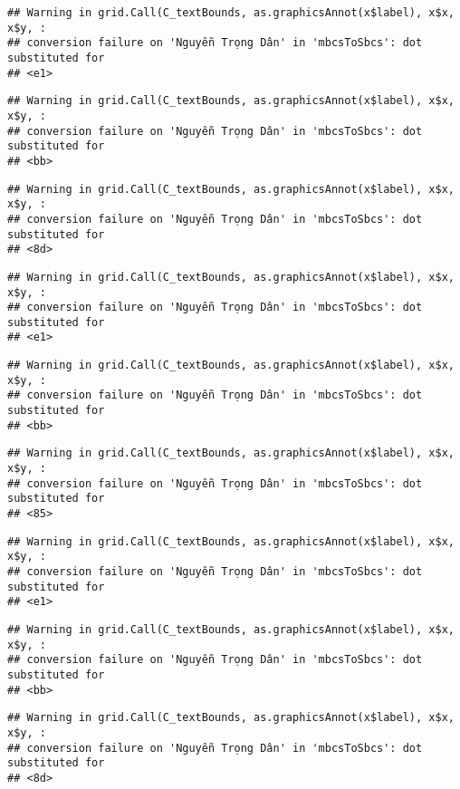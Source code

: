 \documentclass[
]{article}
\begin{document}
\begin{verbatim}
## Warning in grid.Call(C_textBounds, as.graphicsAnnot(x$label), x$x, x$y, :
## conversion failure on 'Nguyễn Trọng Dân' in 'mbcsToSbcs': dot substituted for
## <e1>
\end{verbatim}

\begin{verbatim}
## Warning in grid.Call(C_textBounds, as.graphicsAnnot(x$label), x$x, x$y, :
## conversion failure on 'Nguyễn Trọng Dân' in 'mbcsToSbcs': dot substituted for
## <bb>
\end{verbatim}

\begin{verbatim}
## Warning in grid.Call(C_textBounds, as.graphicsAnnot(x$label), x$x, x$y, :
## conversion failure on 'Nguyễn Trọng Dân' in 'mbcsToSbcs': dot substituted for
## <8d>
\end{verbatim}

\begin{verbatim}
## Warning in grid.Call(C_textBounds, as.graphicsAnnot(x$label), x$x, x$y, :
## conversion failure on 'Nguyễn Trọng Dân' in 'mbcsToSbcs': dot substituted for
## <e1>
\end{verbatim}

\begin{verbatim}
## Warning in grid.Call(C_textBounds, as.graphicsAnnot(x$label), x$x, x$y, :
## conversion failure on 'Nguyễn Trọng Dân' in 'mbcsToSbcs': dot substituted for
## <bb>
\end{verbatim}

\begin{verbatim}
## Warning in grid.Call(C_textBounds, as.graphicsAnnot(x$label), x$x, x$y, :
## conversion failure on 'Nguyễn Trọng Dân' in 'mbcsToSbcs': dot substituted for
## <85>
\end{verbatim}

\begin{verbatim}
## Warning in grid.Call(C_textBounds, as.graphicsAnnot(x$label), x$x, x$y, :
## conversion failure on 'Nguyễn Trọng Dân' in 'mbcsToSbcs': dot substituted for
## <e1>
\end{verbatim}

\begin{verbatim}
## Warning in grid.Call(C_textBounds, as.graphicsAnnot(x$label), x$x, x$y, :
## conversion failure on 'Nguyễn Trọng Dân' in 'mbcsToSbcs': dot substituted for
## <bb>
\end{verbatim}

\begin{verbatim}
## Warning in grid.Call(C_textBounds, as.graphicsAnnot(x$label), x$x, x$y, :
## conversion failure on 'Nguyễn Trọng Dân' in 'mbcsToSbcs': dot substituted for
## <8d>
\end{verbatim}
\end{document}

